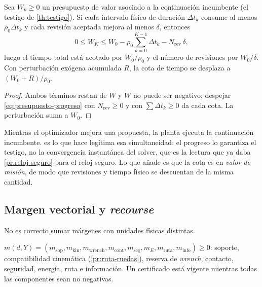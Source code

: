 \begin{proposicion}
\label{pr:presupuesto-progreso}
Sea $W_k\ge0$ un presupuesto de valor asociado a la continuación incumbente
(el testigo de \cref{th:testigo}). Si cada intervalo físico de duración
$\Delta t_k$ consume al menos $\rho_0\Delta t_k$ y cada revisión aceptada
mejora al menos $\delta$, entonces
\begin{equation}
  \label{eq:presupuesto-progreso}
  0\le W_K\le W_0-\rho_0\sum_{k=0}^{K-1}\Delta t_k-N_{\mathrm{rev}}\,\delta ,
\end{equation}
luego el tiempo total está acotado por $W_0/\rho_0$ y el número de revisiones
por $W_0/\delta$. Con perturbación exógena acumulada $R$, la cota de tiempo se
desplaza a $(W_0+R)/\rho_0$.
\end{proposicion}

\begin{proof}
Ambos términos restan de $W$ y $W$ no puede ser negativo; despejar
\eqref{eq:presupuesto-progreso} con $N_{\mathrm{rev}}\ge0$ y con
$\sum\Delta t_k\ge0$ da cada cota. La perturbación suma a $W_0$.
\end{proof}

\begin{observacion}
\label{obs:ejecutar-calculando}
Mientras el optimizador mejora una propuesta, la planta ejecuta la continuación
incumbente.  es lo que hace legítima esa
simultaneidad: el progreso lo garantiza el testigo, no la convergencia
instantánea del solver, que es la lectura que ya daba \cref{pr:reloj-seguro}
para el reloj seguro. Lo que añade es que la cota es en \emph{valor de misión},
de modo que revisiones y tiempo físico se descuentan de la misma cantidad.
\end{observacion}

\subsection{Margen vectorial y \emph{recourse}}

No es correcto sumar márgenes con unidades físicas distintas.

\begin{definicion}
\label{def:margen-vectorial}
$m(d,Y)=(m_{\mathrm{sop}},m_{\mathrm{kin}},m_{\mathrm{wrench}},
m_{\mathrm{cont}},m_{\mathrm{seg}},m_{E},m_{\mathrm{ruta}},m_{\mathrm{info}})\ge0$:
soporte, compatibilidad cinemática (\cref{pr:ruta-ruedas}), reserva de
\emph{wrench}, contacto, seguridad, energía, ruta e información. Un
certificado está vigente mientras todas las componentes sean no negativas.
\end{definicion}

